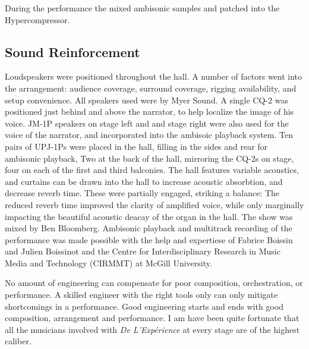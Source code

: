 During the performance the mixed ambisonic samples and patched into
the Hypercompressor. 




\subsection{Sound Reinforcement}
\label{sec:sound-reinforcement}
Loudspeakers were positioned throughout the hall. A number of factors
went into the arrangement: audience coverage, surround coverage,
rigging availability, and setup convenience. All speakers used were by
Myer Sound. A single CQ-2
was positioned just behind and above the narrator, to help localize
the image of his voice.  JM-1P speakers on stage left and and stage
right were also used for the voice of the narrator, and incorporated
into the ambisoic playback system. Ten pairs of UPJ-1Ps were placed in
the hall, filling in the sides and rear for ambisonic playback, Two at
the back of the hall, mirroring the CQ-2s on stage, four on each of
the first and third balconies.  The hall features variable acoustics,
and curtains can be drawn into the hall to increase acoustic
absorbtion, and decrease reverb time. These were partially engaged,
striking a balance: The reduced reverb time improved the clarity of
amplified voice, while only marginally impacting the beautiful
acoustic deacay of the organ in the hall. The show was mixed by Ben
Bloomberg. Ambisonic playback and multitrack recording of the
performance was made possible with the help and expertiese of Fabrice
Boissin and Julien Boissinot and the Centre for Interdisciplinary
Research in Music Media and Technology (CIRMMT) at McGill University.

No amount of engineering can compensate for poor composition,
orchestration, or performance. A skilled engineer with the right tools
only can only mitigate shortcomings in a performance. Good engineering
starts and ends with good composition, arrangement and performance. I
am have been quite fortunate that all the musicians involved with
\textit{De L'Exp\'{e}rience} at every stage are of the highest
caliber.


